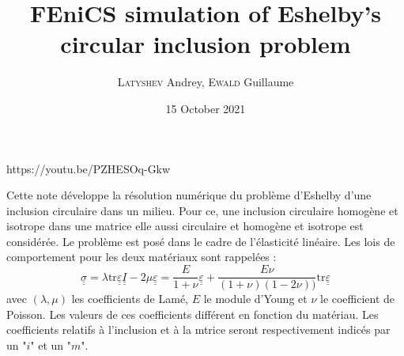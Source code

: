 https://youtu.be/PZHESOq-Gkw\documentclass{article}
\title{FEniCS simulation of Eshelby's circular inclusion problem}
\author{\textsc{Latyshev} Andrey, \textsc{Ewald} Guillaume}
\date{15 October 2021}
\begin{document}
\maketitle

Cette note développe la résolution numérique du problème d'Eshelby d'une inclusion circulaire dans un milieu. Pour ce, une inclusion circulaire homogène et isotrope dans une matrice elle aussi circulaire et homogène et isotrope est considérée. Le problème est posé dans le cadre de l'élasticité linéaire. Les lois de comportement pour les deux matériaux sont rappelées :
\begin{equation}
    \underline{\underline{\sigma}} = \lambda \text{tr}\underline{\underline{\varepsilon}} \underline{\underline{I}} - 2\mu\underline{\underline{\varepsilon}} = \frac{E}{1+\nu}\underline{\underline{\varepsilon}} + \frac{E\nu}{(1+\nu)(1-2\nu))} \text{tr}\underline{\underline{\varepsilon}}
\end{equation}
avec $(\lambda, \mu)$ les coefficients de Lamé, $E$ le module d'Young et $\nu$ le coefficient de Poisson. Les valeurs de ces coefficients différent en fonction du matériau. Les coefficients relatifs à l'inclusion et à la mtrice seront respectivement indicés par un "$i$" et un "$m$".  
\end{document}

